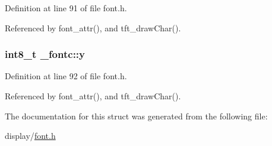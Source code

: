 Definition at line 91 of file font.\-h.



Referenced by font\-\_\-attr(), and tft\-\_\-draw\-Char().

\hypertarget{struct__fontc_aebbde0dc41068722ee1a69f4a56478a4}{
\subsubsection[{y}]{\setlength{\rightskip}{0pt plus 5cm}int8\-\_\-t \-\_\-fontc\-::y}}\label{struct__fontc_aebbde0dc41068722ee1a69f4a56478a4}


Definition at line 92 of file font.\-h.



Referenced by font\-\_\-attr(), and tft\-\_\-draw\-Char().



The documentation for this struct was generated from the following file\-:\begin{DoxyCompactItemize}
\item 
display/\hyperlink{display_2font_8h}{font.\-h}\end{DoxyCompactItemize}
